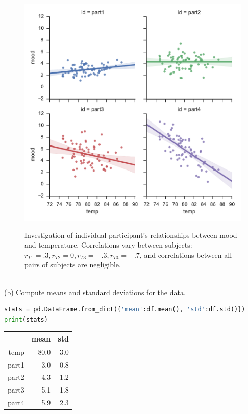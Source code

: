 \documentclass[onecolumn,10pt]{jhwhw}
\begin{document}
\begin{figure}[h!]
\begin{center}
\includegraphics[height=0.55\textheight]{p1-persubj.pdf}
\label{fig:on}
\end{center}
\caption{Investigation of individual participant's relationships between mood and temperature. Correlations vary between subjects: $r_{T1} = .3, r_{T2} = 0, r_{T3} = -.3, r_{T4} = -.7$, and correlations between all pairs of subjects are negligible.}
\end{figure}
\\
(b) Compute means and standard deviations for the data.\\
\begin{lstlisting}[language=Python]
stats = pd.DataFrame.from_dict({'mean':df.mean(), 'std':df.std()})
print(stats)
\end{lstlisting}
\begin{table}[h!]
\begin{center}
\begin{tabular}{rrr}
\toprule
          &  mean  &      std \\
\midrule
temp      & 80.0  & 3.0 \\
part1     &  3.0  & 0.8 \\
part2     &  4.3  & 1.2 \\
part3     &  5.1  & 1.8 \\
part4     &  5.9  & 2.3 \\
\bottomrule
\end{tabular}
\end{center}
\end{table}
\end{document}
